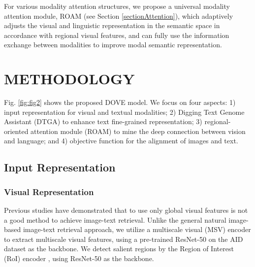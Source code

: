 \documentclass[journal]{IEEEtran}
\begin{document}
For various modality attention structures, we propose a universal modality attention module, ROAM (see Section \ref{sectionAttention}), which adaptively adjusts the visual and linguistic representation in the semantic space in accordance with regional visual features, and can fully use the information exchange between modalities to improve modal semantic representation.

\section{METHODOLOGY}
Fig. \ref{fig:fig2} shows the proposed DOVE model. We focus on four aspects: 1) input representation for visual and textual modalities; 2) Digging Text Genome Assistant (DTGA) to enhance text fine-grained representation; 3) regional-oriented attention module (ROAM) to mine the deep connection between vision and language; and 4) objective function for the alignment of images and text.
\subsection{Input Representation}
\subsubsection{Visual Representation}
Previous studies \cite{yuan2022remote,ji2019saliency} have demonstrated that to use only global visual features is not a good method to achieve image-text retrieval. Unlike the general natural image-based image-text retrieval approach, we utilize a multiscale visual (MSV) encoder to extract multiscale visual features, using a pre-trained ResNet-50 \cite{he2016deep} on the AID dataset \cite{xia2017aid} as the backbone. We detect salient regions by the Region of Interest (RoI) encoder \cite{ding2019learning}, using ResNet-50 as the backbone.
\end{document}
